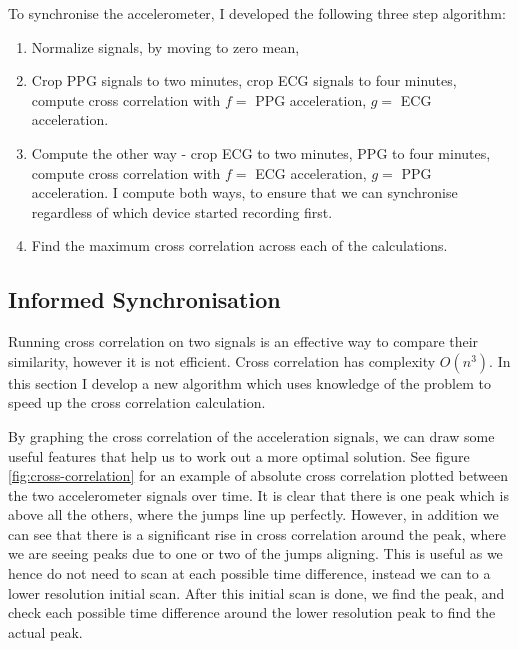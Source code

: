 \documentclass[12pt,a4paper,twoside,openright]{report}
\begin{document}
To synchronise the accelerometer, I developed the following three step 
algorithm:
\begin{enumerate}
	\item Normalize signals, by moving to zero mean, 

	\item Crop PPG signals to two minutes, crop ECG signals to four
		minutes, compute cross correlation with \(f=\) PPG
		acceleration, \(g=\) ECG acceleration.

	\item Compute the other way - crop ECG to two minutes, PPG to four
		minutes, compute cross correlation with \(f=\) ECG
		acceleration, \(g=\) PPG acceleration. I compute both ways, to
		ensure that we can synchronise regardless of which device
		started recording first.

	\item Find the maximum cross correlation across each of the
		calculations.







\end{enumerate}

\subsection{Informed Synchronisation}

Running cross correlation on two signals is an effective way to compare their
similarity, however it is not efficient. Cross correlation has complexity
\(O(n^3)\). In this section I develop a new algorithm which uses knowledge of
the problem to speed up the cross correlation calculation.

By graphing the cross correlation of the acceleration signals, we can draw
some useful features that help us to work out a more optimal solution. See
figure \ref{fig:cross-correlation} for an example of absolute cross correlation plotted
between the two accelerometer signals over time. It is clear that there is one
peak which is above all the others, where the jumps line up perfectly.
However, in addition we can see that there is a significant rise in cross
correlation around the peak, where we are seeing peaks due to one or two of
the jumps aligning. This is useful as we hence do not need to scan at each
possible time difference, instead we can to a lower resolution initial scan.
After this initial scan is done, we find the peak, and check each possible
time difference around the lower resolution peak to find the actual peak.
\end{document}
